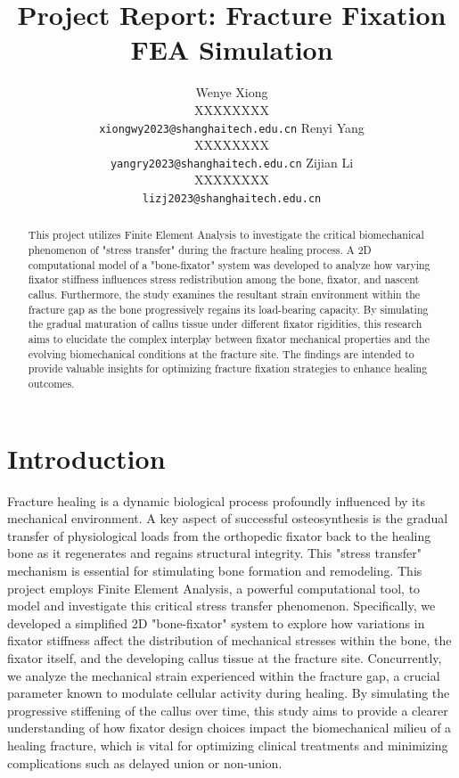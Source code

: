 \documentclass{article}
\title{Project Report: Fracture Fixation FEA Simulation}
\author{
  Wenye Xiong \\
  XXXXXXXX \\
  \texttt{xiongwy2023@shanghaitech.edu.cn}
  \And
  Renyi Yang \\
  XXXXXXXX \\
  \texttt{yangry2023@shanghaitech.edu.cn}
  \AND
  Zijian Li \\
  XXXXXXXX \\
  \texttt{lizj2023@shanghaitech.edu.cn}
}
\begin{document}
\maketitle

\begin{abstract}
  This project utilizes Finite Element Analysis to investigate the critical biomechanical phenomenon of "stress transfer" during the fracture healing process. A 2D computational model of a "bone-fixator" system was developed to analyze how varying fixator stiffness influences stress redistribution among the bone, fixator, and nascent callus. Furthermore, the study examines the resultant strain environment within the fracture gap as the bone progressively regains its load-bearing capacity. By simulating the gradual maturation of callus tissue under different fixator rigidities, this research aims to elucidate the complex interplay between fixator mechanical properties and the evolving biomechanical conditions at the fracture site. The findings are intended to provide valuable insights for optimizing fracture fixation strategies to enhance healing outcomes.
\end{abstract}



\section{Introduction}

Fracture healing is a dynamic biological process profoundly influenced by its mechanical environment. A key aspect of successful osteosynthesis is the gradual transfer of physiological loads from the orthopedic fixator back to the healing bone as it regenerates and regains structural integrity. This "stress transfer" mechanism is essential for stimulating bone formation and remodeling. This project employs Finite Element Analysis, a powerful computational tool, to model and investigate this critical stress transfer phenomenon. Specifically, we developed a simplified 2D "bone-fixator" system to explore how variations in fixator stiffness affect the distribution of mechanical stresses within the bone, the fixator itself, and the developing callus tissue at the fracture site. Concurrently, we analyze the mechanical strain experienced within the fracture gap, a crucial parameter known to modulate cellular activity during healing. By simulating the progressive stiffening of the callus over time, this study aims to provide a clearer understanding of how fixator design choices impact the biomechanical milieu of a healing fracture, which is vital for optimizing clinical treatments and minimizing complications such as delayed union or non-union.
\end{document}
